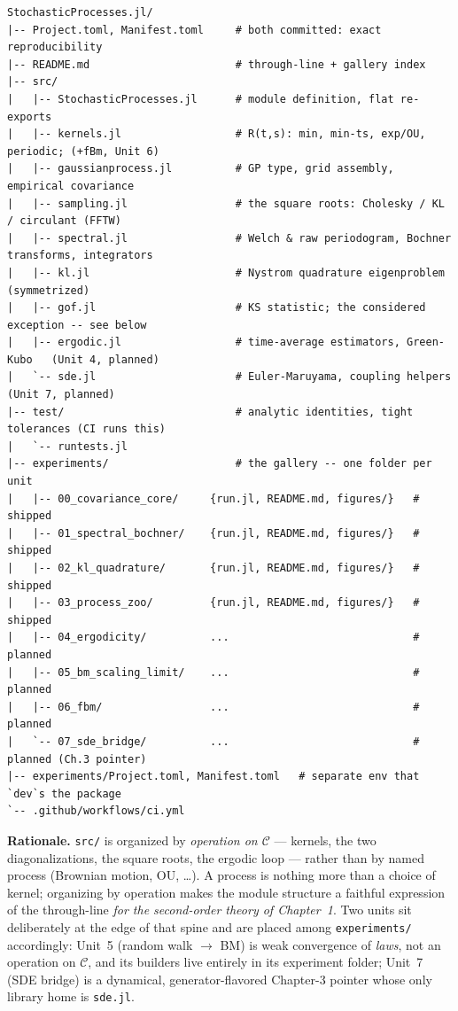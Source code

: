 \documentclass[11pt]{article}
\begin{document}
\begin{verbatim}
StochasticProcesses.jl/
|-- Project.toml, Manifest.toml     # both committed: exact reproducibility
|-- README.md                       # through-line + gallery index
|-- src/
|   |-- StochasticProcesses.jl      # module definition, flat re-exports
|   |-- kernels.jl                  # R(t,s): min, min-ts, exp/OU, periodic; (+fBm, Unit 6)
|   |-- gaussianprocess.jl          # GP type, grid assembly, empirical covariance
|   |-- sampling.jl                 # the square roots: Cholesky / KL / circulant (FFTW)
|   |-- spectral.jl                 # Welch & raw periodogram, Bochner transforms, integrators
|   |-- kl.jl                       # Nystrom quadrature eigenproblem (symmetrized)
|   |-- gof.jl                      # KS statistic; the considered exception -- see below
|   |-- ergodic.jl                  # time-average estimators, Green-Kubo   (Unit 4, planned)
|   `-- sde.jl                      # Euler-Maruyama, coupling helpers      (Unit 7, planned)
|-- test/                           # analytic identities, tight tolerances (CI runs this)
|   `-- runtests.jl
|-- experiments/                    # the gallery -- one folder per unit
|   |-- 00_covariance_core/     {run.jl, README.md, figures/}   # shipped
|   |-- 01_spectral_bochner/    {run.jl, README.md, figures/}   # shipped
|   |-- 02_kl_quadrature/       {run.jl, README.md, figures/}   # shipped
|   |-- 03_process_zoo/         {run.jl, README.md, figures/}   # shipped
|   |-- 04_ergodicity/          ...                             # planned
|   |-- 05_bm_scaling_limit/    ...                             # planned
|   |-- 06_fbm/                 ...                             # planned
|   `-- 07_sde_bridge/          ...                             # planned (Ch.3 pointer)
|-- experiments/Project.toml, Manifest.toml   # separate env that `dev`s the package
`-- .github/workflows/ci.yml
\end{verbatim}

\textbf{Rationale.} \texttt{src/} is organized by \emph{operation on $\mathcal{C}$} --- kernels, the
two diagonalizations, the square roots, the ergodic loop --- rather than by named process (Brownian
motion, OU, \ldots). A process is nothing more than a choice of kernel; organizing by operation makes
the module structure a faithful expression of the through-line \emph{for the second-order theory of
Chapter~1}. Two units sit deliberately at the edge of that spine and are placed among
\texttt{experiments/} accordingly: Unit~5 (random walk $\to$ BM) is weak convergence of \emph{laws},
not an operation on $\mathcal{C}$, and its builders live entirely in its experiment folder; Unit~7
(SDE bridge) is a dynamical, generator-flavored Chapter-3 pointer whose only library home is
\texttt{sde.jl}.
\end{document}
